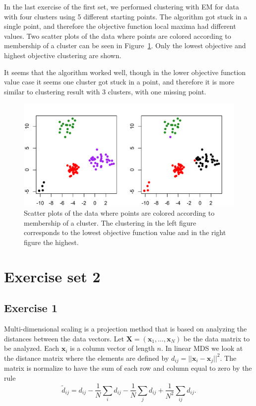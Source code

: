 \documentclass{article}
\renewcommand\vec[1]{\ensuremath{\mathbf{#1}}}
\begin{document}
In the last exercise of the first set, we performed clustering with EM
for data with four clusters using 5 different starting points. The
algorithm got stuck in a single point, and therefore the objective
function local maxima had different values. Two scatter plots of the data
where points are colored according to membership of a cluster can be
seen in Figure~\ref{fig:4cluster}. Only the lowest objective and
highest objective clustering are shown.

It seems that the algorithm worked well, though in the lower objective
function value case it seems one cluster got stuck in a point, and
therefore it is more similar to clustering result with 3 clusters,
with one missing point.

\begin{figure}[h!]
	\includegraphics[width=\columnwidth]{4cluster.pdf}
	\caption{Scatter plots of the data
where points are colored according to membership of a cluster. The clustering
in the left figure corresponds to the lowest objective function value and
in the right figure the highest.}\label{fig:4cluster}
\end{figure}



\section{Exercise set 2}
\subsection{Exercise 1}\label{sec:ex21}
Multi-dimensional scaling is a projection method that is based on analyzing the distances between the data vectors.
Let $\vec X=(\vec x_1,\dots,\vec x_N)$ be the data matrix to be analyzed.
Each $\vec x_i$ is a column vector of length $n$.
In linear MDS we look at the distance matrix where the elements are defined by $d_{ij}=||\vec x_i-\vec x_j||^2$.
The matrix is normalize to have the sum of each row and column equal to zero by the rule
$$ \tilde{d}_{ij} = d_{ij} - \frac{1}{N}\sum_id_{ij} - \frac{1}{N}\sum_jd_{ij} + \frac{1}{N^2}\sum_{ij}d_{ij}. $$
\end{document}
